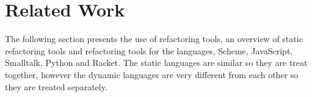 
% 
% 

\section{Related Work}

The following section presents the use of refactoring tools, an overview of static refactoring tools and refactoring tools for the languages, Scheme, JavaScript, Smalltalk, Python and Racket.
The static languages are similar so they are treat together, however the dynamic languages are very different from each other so they are treated separately.




%
 













